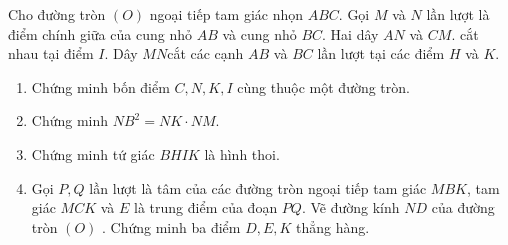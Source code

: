 \begin{bt}%
	Cho đường tròn $(O)$ ngoại tiếp tam giác nhọn $ABC$. Gọi $M$ và $N$ lần lượt là điểm chính giữa của cung nhỏ $AB$ và cung nhỏ $BC$. Hai dây $AN$ và $CM$. cắt nhau tại điểm $I$. Dây $MN$cắt các cạnh $AB$ và $BC$ lần lượt tại các điểm $H$ và $K$. 
	\begin{enumerate}
		\item Chứng minh bốn điểm $C,N,K,I$ cùng thuộc một đường tròn.
		\item Chứng minh $NB^2=NK\cdot NM$.
		\item Chứng minh tứ giác $BHIK$ là hình thoi.
		\item Gọi $P,Q$ lần lượt là tâm của các đường tròn ngoại tiếp tam giác $MBK$, tam giác $MCK$ và $E$ là trung điểm của đoạn $PQ$. Vẽ đường kính $ND$ của đường tròn $(O)$ . Chứng minh ba điểm  $D,E,K$ thẳng hàng.
	\end{enumerate}
\end{bt}
